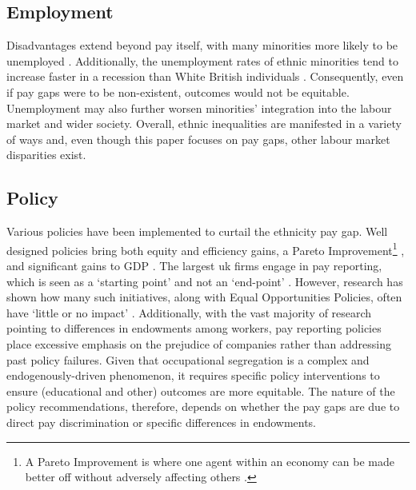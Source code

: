 \documentclass[class=article, crop=false]{standalone}
\begin{document}
\subsection{Employment}
\label{sec:Employment}
Disadvantages extend beyond pay itself, with many minorities more likely to be unemployed \citep{Heath}. Additionally, the unemployment rates of ethnic minorities tend to increase faster in a recession than White British individuals \citep{Jones}. Consequently, even if pay gaps were to be non-existent, outcomes would not be equitable. Unemployment may also further worsen minorities' integration into the labour market and wider society. Overall, ethnic inequalities are manifested in a variety of ways and, even though this paper focuses on pay gaps, other labour market disparities exist. %

\subsection{Policy}
\label{sec:Policy} %
Various policies have been implemented to curtail the ethnicity pay gap. Well designed policies bring both equity and efficiency gains, a Pareto Improvement\footnote{A Pareto Improvement is where one agent within an economy can be made better off without adversely affecting others \citep{Varian}.} \citep{LundbergB}, and significant gains to GDP \citep{GOVg}. The largest \acrshort{uk} firms engage in pay reporting, which is seen as a \enquote*{starting point} and not an \enquote*{end-point} \cite[p.~39]{BoE}. However, research has shown how many such initiatives, along with Equal Opportunities Policies, often have \enquote*{little or no impact} \cite[p.~113]{Noon}. Additionally, with the vast majority of research pointing to differences in endowments among workers, pay reporting policies place excessive emphasis on the prejudice of companies rather than addressing past policy failures. Given that occupational segregation is a complex and endogenously-driven phenomenon, it requires specific policy interventions to ensure (educational and other) outcomes are more equitable. The nature of the policy recommendations, therefore, depends on whether the pay gaps are due to direct pay discrimination or specific differences in endowments.

\ifstandalone

\fi
\end{document}
